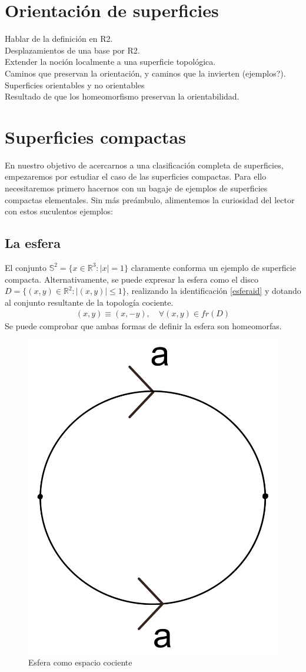 \documentclass[a4paper,11pt,spanish, twoside, leqno]{tfg-uam}
\theoremstyle{definition}
\begin{document}
\section{Orientación de superficies}
Hablar de la definición en R2.\\
Desplazamientos de una base por R2. \\
Extender la noción localmente a una superficie topológica.\\
Caminos que preservan la orientación, y caminos que la invierten (ejemplos?).\\
Superficies orientables y no orientables\\
Resultado de que los homeomorfismo preservan la orientabilidad.\\



\section{Superficies compactas}

En nuestro objetivo de acercarnos a una clasificación  completa de superficies, empezaremos por estudiar el caso de las superficies compactas. Para ello necesitaremos primero hacernos con un bagaje de ejemplos de superficies compactas elementales. Sin más preámbulo, alimentemos la curiosidad del lector con estos suculentos ejemplos:

\subsection*{La esfera}
El conjunto $ \mathbb{S}^2 = \{x\in \mathbb{R}^3: |x|=1 \} $ claramente conforma un ejemplo de superficie compacta. Alternativamente, se puede expresar la esfera como el disco $ D = \{(x,y)\in\mathbb{R}^2: |(x,y)|\leq1 \} $, realizando la identificación  \ref{esferaid} y dotando al conjunto resultante de la topología cociente.
\begin{align}\label{esferaid}
	(x,y)\equiv(x,-y),\quad\forall(x,y)\in fr(D)
\end{align}
Se puede comprobar que ambas formas de definir la esfera son homeomorfas. 

\begin{figure}[h!]
	\centering
	\includegraphics[width=0.2\linewidth]{imagenes/esfera_plana.png}
	\caption{Esfera como espacio cociente}
	\label{fig:esfera expresion canonica}
\end{figure} 
\end{document}
